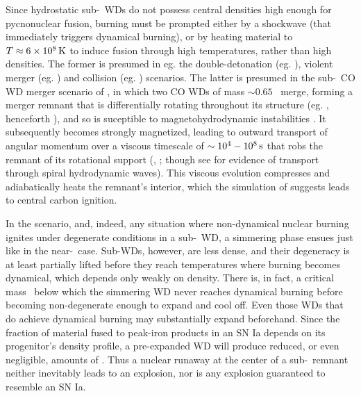 Since hydrostatic sub-\Mch\ WDs do not possess central densities high enough for pycnonuclear fusion, burning must be prompted either by a shockwave (that immediately triggers dynamical burning), or by heating material to $T\approx6\times10^8\,\mathrm{K}$ to induce fusion through high temperatures, rather than high densities.  The former is presumed in eg. the double-detonation (eg. \citealt{fink+07, woosk11}), violent merger (eg. \citealt{pakm+10}) and collision (eg. \citealt{loreig10}) scenarios.  The latter is presumed in the sub-\Mch\ CO WD merger scenario of \citeal{vkercj10}, in which two CO WDs of mass $\sim0.65$ \Msun\ merge, forming a merger remnant that is differentially rotating throughout its structure (eg. \citealt{zhu+13}, henceforth \citeal{zhu+13}), and so is suceptible to magnetohydrodynamic instabilities \citep{shen+12, ji+13}.  It subsequently becomes strongly magnetized, leading to outward transport of angular momentum over a viscous timescale of $\sim10^4 - 10^8\,\mathrm{s}$ that robs the remnant of its rotational support (\citeal{vkercj10}, \citealt{shen+12}; though see \citealt{kash+15, zhu+15} for evidence of transport through spiral hydrodynamic waves).  This viscous evolution compresses and adiabatically heats the remnant's interior, which the simulation of \cite{ji+13} suggests leads to central carbon ignition.

In the \citeal{vkercj10} scenario, and, indeed, any situation where non-dynamical nuclear burning ignites under degenerate conditions in a sub-\Mch\ WD, a simmering phase ensues just like in the near-\Mch\ case.  Sub-\Mch WDs, however, are less dense, and their degeneracy is at least partially lifted before they reach temperatures where burning becomes dynamical, which depends only weakly on density.  There is, in fact, a critical mass \Mcrit\ below which the simmering WD never reaches dynamical burning before becoming non-degenerate enough to expand and cool off.  Even those WDs that do achieve dynamical burning may substantially expand beforehand.  Since the fraction of material fused to peak-iron products in an SN Ia depends on its progenitor's density profile, a pre-expanded WD will produce reduced, or even negligible, amounts of \Ni.  Thus a nuclear runaway at the center of a sub-\Mch\ remnant neither inevitably leads to an explosion, nor is any explosion guaranteed to resemble an SN Ia.


